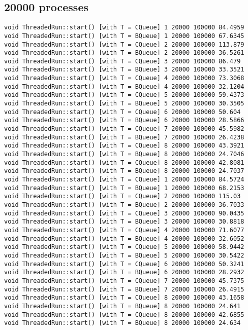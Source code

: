 \subsection{20000 processes}
\small
\begin{verbatim}
void ThreadedRun::start() [with T = CQueue] 1 20000 100000 84.4959
void ThreadedRun::start() [with T = BQueue] 1 20000 100000 67.6345
void ThreadedRun::start() [with T = CQueue] 2 20000 100000 113.879
void ThreadedRun::start() [with T = BQueue] 2 20000 100000 36.5261
void ThreadedRun::start() [with T = CQueue] 3 20000 100000 86.479
void ThreadedRun::start() [with T = BQueue] 3 20000 100000 33.3521
void ThreadedRun::start() [with T = CQueue] 4 20000 100000 73.3068
void ThreadedRun::start() [with T = BQueue] 4 20000 100000 32.1204
void ThreadedRun::start() [with T = CQueue] 5 20000 100000 59.4373
void ThreadedRun::start() [with T = BQueue] 5 20000 100000 30.3505
void ThreadedRun::start() [with T = CQueue] 6 20000 100000 50.604
void ThreadedRun::start() [with T = BQueue] 6 20000 100000 28.5866
void ThreadedRun::start() [with T = CQueue] 7 20000 100000 45.5982
void ThreadedRun::start() [with T = BQueue] 7 20000 100000 26.4238
void ThreadedRun::start() [with T = CQueue] 8 20000 100000 43.3921
void ThreadedRun::start() [with T = BQueue] 8 20000 100000 24.7046
void ThreadedRun::start() [with T = CQueue] 8 20000 100000 42.8081
void ThreadedRun::start() [with T = BQueue] 8 20000 100000 24.7037
void ThreadedRun::start() [with T = CQueue] 1 20000 100000 84.5724
void ThreadedRun::start() [with T = BQueue] 1 20000 100000 68.2153
void ThreadedRun::start() [with T = CQueue] 2 20000 100000 115.03
void ThreadedRun::start() [with T = BQueue] 2 20000 100000 36.7033
void ThreadedRun::start() [with T = CQueue] 3 20000 100000 90.0435
void ThreadedRun::start() [with T = BQueue] 3 20000 100000 30.8818
void ThreadedRun::start() [with T = CQueue] 4 20000 100000 71.6077
void ThreadedRun::start() [with T = BQueue] 4 20000 100000 32.6052
void ThreadedRun::start() [with T = CQueue] 5 20000 100000 58.9442
void ThreadedRun::start() [with T = BQueue] 5 20000 100000 30.5422
void ThreadedRun::start() [with T = CQueue] 6 20000 100000 50.3241
void ThreadedRun::start() [with T = BQueue] 6 20000 100000 28.2932
void ThreadedRun::start() [with T = CQueue] 7 20000 100000 45.7375
void ThreadedRun::start() [with T = BQueue] 7 20000 100000 26.4915
void ThreadedRun::start() [with T = CQueue] 8 20000 100000 43.1658
void ThreadedRun::start() [with T = BQueue] 8 20000 100000 24.641
void ThreadedRun::start() [with T = CQueue] 8 20000 100000 42.6855
void ThreadedRun::start() [with T = BQueue] 8 20000 100000 24.634

\end{verbatim}
